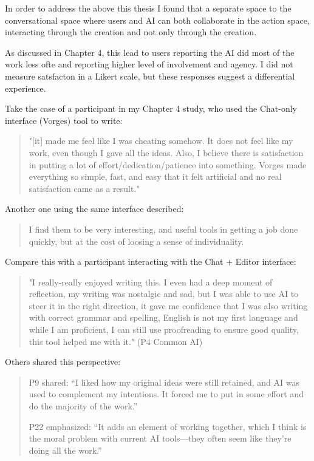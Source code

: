 In order to address the above this thesis I found that a separate space to the conversational space where users and AI can both collaborate in the action space, interacting through the creation and not only through the creation. 

As discussed in Chapter 4, this lead to users reporting the AI did most of the work less ofte and reporting higher level of involvement and agency. I did not measure satsfacton in a Likert scale, but these responses suggest a differential experience. 

Take the case of a participant in my Chapter 4 study, who used the Chat-only interface (Vorges) tool to write:

\begin{quote}
"[it] made me feel like I was cheating somehow. It does not feel like my work, even though I gave all the ideas. Also, I believe there is satisfaction in putting a lot of effort/dedication/patience into something. Vorges made everything so simple, fast, and easy that it felt artificial and no real satisfaction came as a result."
\end{quote}
Another one using the same interface described: 

\begin{quote}
I find them to be very interesting, and useful tools in getting a job done quickly, but at the cost of loosing a sense of individuality. 
\end{quote}
Compare this with a participant interacting with the Chat + Editor interface:

\begin{quote}
"I really-really enjoyed writing this. I even had a deep moment of reflection, my writing was nostalgic and sad, but I was able to use AI to steer it in the right direction, it gave me confidence that I was also writing with correct grammar and spelling, English is not my first language and while I am proficient, I can still use proofreading to ensure good quality, this tool helped me with it." (P4 Common AI)
\end{quote}
Others shared this perspective:
\begin{quote}
P9 shared: “I liked how my original ideas were still retained, and AI was used to complement my intentions. It forced me to put in some effort and do the majority of the work.”

P22 emphasized: “It adds an element of working together, which I think is the moral problem with current AI tools—they often seem like they’re doing all the work.”
\end{quote}


